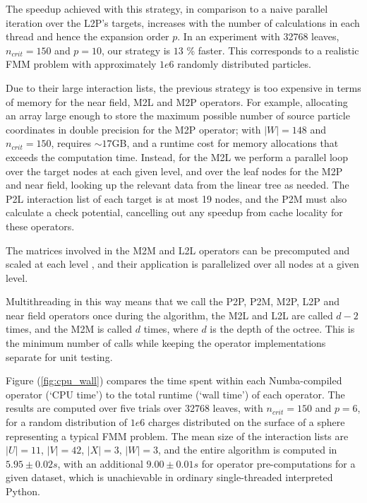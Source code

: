 \documentclass{IEEEcsmag}
\begin{document}
The speedup achieved with this strategy, in comparison to a naive parallel iteration over the L2P's targets, increases with the number of calculations in each thread and hence the expansion order $p$. In an experiment with 32768 leaves, $n_{crit} = 150$ and $p=10$, our strategy is $13$ \% faster. This corresponds to a realistic FMM problem with approximately $1e6$ randomly distributed particles.

Due to their large interaction lists, the previous strategy is too expensive in terms of memory for the near field, M2L and M2P operators. For example, allocating an array large enough to store the maximum possible number of source particle coordinates in double precision for the M2P operator; with $|W|=148$ and $n_{crit}=150$, requires $\sim 17$GB, and a runtime cost for memory allocations that exceeds the computation time. Instead, for the M2L we perform a parallel loop over the target nodes at each given level, and over the leaf nodes for the M2P and near field, looking up the relevant data from the linear tree as needed. The P2L interaction list of each target is at most 19 nodes, and the P2M must also calculate a check potential, cancelling out any speedup from cache locality for these operators.

The matrices involved in the M2M and L2L operators can be precomputed and scaled at each level \cite{Wang2021}, and their application is parallelized over all nodes at a given level.

Multithreading in this way means that we call the P2P, P2M, M2P, L2P and near field operators once during the algorithm, the M2L and L2L are called $d-2$ times, and the M2M is called $d$ times, where $d$ is the depth of the octree. This is the minimum number of calls while keeping the operator implementations separate for unit testing.

Figure (\ref{fig:cpu_wall}) compares the time spent within each Numba-compiled operator (`CPU time') to the total runtime (`wall time') of each operator. The results are computed over five trials over $32768$ leaves, with $n_{crit}=150$ and $p=6$, for a random distribution of $1e6$ charges distributed on the surface of a sphere representing a typical FMM problem. The mean size of the interaction lists are $|U|=11$, $|V|=42$, $|X|=3$, $|W|=3$, and the entire algorithm is computed in $5.95 \pm 0.02 s$, with an additional $9.00 \pm 0.01 s$ for operator pre-computations for a given dataset, which is unachievable in ordinary single-threaded interpreted Python.
\end{document}
